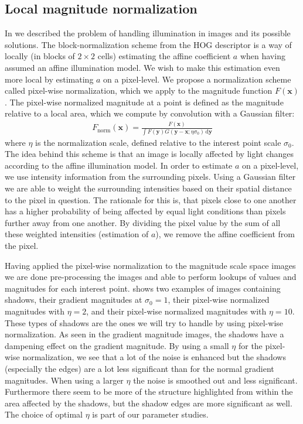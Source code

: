\documentclass[thesis.tex]{subfiles}
\def\x{\mathbf{x}}
\def\y{\mathbf{y}}
\begin{document}
\subsection{Local magnitude normalization}
\label{sec:localMagnitudeNormalization}
%
In  we described the problem of handling illumination in images and its possible solutions. The block-normalization scheme from the HOG descriptor \cite{dalal2005histograms} is a way of locally (in blocks of $2 \times 2$ cells) estimating the affine coefficient $a$ when having assumed an affine illumination model. We wish to make this estimation even more local by estimating $a$ on a pixel-level. We propose a normalization scheme called pixel-wise normalization, which we apply to the magnitude function $F(\x)$.
The pixel-wise normalized magnitude at a point is defined as the magnitude relative to a local area, which we compute by convolution with a Gaussian filter:
%
\begin{align}
F_\text{norm}(\x) = \frac{F(\x)}{\int F(\y) G(\y - \x; \eta \sigma_0) \,\text{d} \y}
\end{align}
%
where $\eta$ is the normalization scale, defined relative to the interest point scale $\sigma_0$. The idea behind this scheme is that an image is locally affected by light changes according to the affine illumination model. In order to estimate $a$ on a pixel-level, we use intensity information from the surrounding pixels. Using a Gaussian filter we are able to weight the surrounding intensities based on their spatial distance to the pixel in question. The rationale for this is, that pixels close to one another has a higher probability of being affected by equal light conditions than pixels further away from one another. By dividing the pixel value by the sum of all these weighted intensities (estimation of $a$), we remove the affine coefficient from the pixel.

Having applied the pixel-wise normalization to the magnitude scale space images we are done pre-processing the images and able to perform lookups of values and magnitudes for each interest point.
 shows two examples of images containing shadows, their gradient magnitudes at $\sigma_0 = 1$, their pixel-wise normalized magnitudes with $\eta = 2$, and their pixel-wise normalized magnitudes with $\eta = 10$. These types of shadows are the ones we will try to handle by using pixel-wise normalization. As seen in the gradient magnitude images, the shadows have a dampening effect on the gradient magnitude. By using a small $\eta$ for the pixel-wise normalization, we see that a lot of the noise is enhanced but the shadows (especially the edges) are a lot less significant than for the normal gradient magnitudes. When using a larger $\eta$ the noise is smoothed out and less significant. Furthermore there seem to be more of the structure highlighted from within the area affected by the shadows, but the shadow edges are more significant as well. The choice of optimal $\eta$ is part of our parameter studies.
\end{document}
